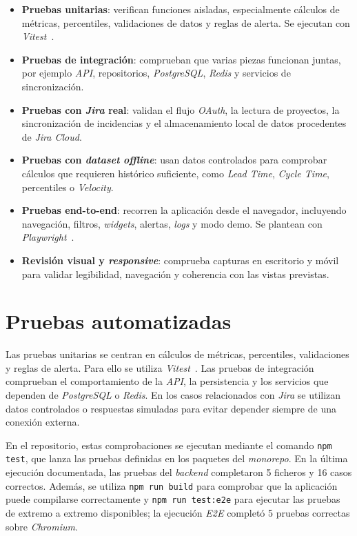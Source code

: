 \begin{itemize}
    \item \textbf{Pruebas unitarias}: verifican funciones aisladas, especialmente cálculos de métricas, percentiles, validaciones de datos y reglas de alerta. Se ejecutan con \textit{Vitest}~\cite{VitestGuide}.
    \item \textbf{Pruebas de integración}: comprueban que varias piezas funcionan juntas, por ejemplo \textit{API}, repositorios, \textit{PostgreSQL}, \textit{Redis} y servicios de sincronización.
    \item \textbf{Pruebas con \textit{Jira} real}: validan el flujo \textit{OAuth}, la lectura de proyectos, la sincronización de incidencias y el almacenamiento local de datos procedentes de \textit{Jira Cloud}.
    \item \textbf{Pruebas con \textit{dataset} \textit{offline}}: usan datos controlados para comprobar cálculos que requieren histórico suficiente, como \textit{Lead Time}, \textit{Cycle Time}, percentiles o \textit{Velocity}.
    \item \textbf{Pruebas end-to-end}: recorren la aplicación desde el navegador, incluyendo navegación, filtros, \textit{widgets}, alertas, \textit{logs} y modo demo. Se plantean con \textit{Playwright}~\cite{PlaywrightDocs}.
    \item \textbf{Revisión visual y \textit{responsive}}: comprueba capturas en escritorio y móvil para validar legibilidad, navegación y coherencia con las vistas previstas.
\end{itemize}

\section{Pruebas automatizadas}

Las pruebas unitarias se centran en cálculos de métricas, percentiles, validaciones y reglas de alerta. Para ello se utiliza \textit{Vitest}~\cite{VitestGuide}. Las pruebas de integración comprueban el comportamiento de la \textit{API}, la persistencia y los servicios que dependen de \textit{PostgreSQL} o \textit{Redis}. En los casos relacionados con \textit{Jira} se utilizan datos controlados o respuestas simuladas para evitar depender siempre de una conexión externa.

En el repositorio, estas comprobaciones se ejecutan mediante el comando \texttt{npm test}, que lanza las pruebas definidas en los paquetes del \textit{monorepo}. En la última ejecución documentada, las pruebas del \textit{backend} completaron 5 ficheros y 16 casos correctos. Además, se utiliza \texttt{npm run build} para comprobar que la aplicación puede compilarse correctamente y \texttt{npm run test:e2e} para ejecutar las pruebas de extremo a extremo disponibles; la ejecución \textit{E2E} completó 5 pruebas correctas sobre \textit{Chromium}.

